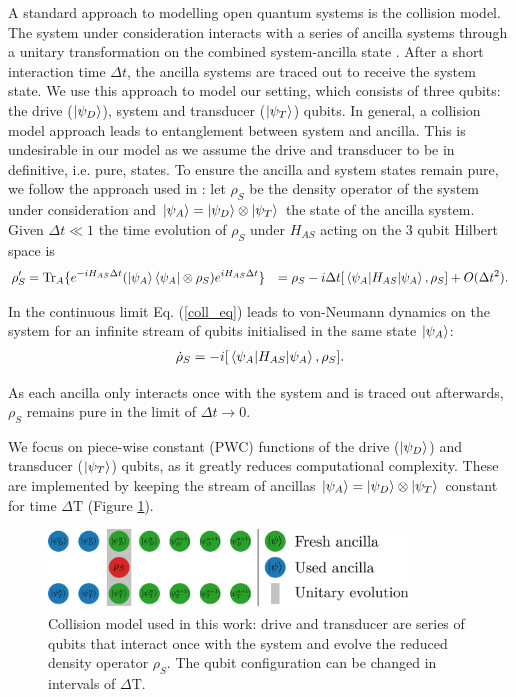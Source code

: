 A standard approach to modelling open quantum systems is the collision model.
The system under consideration interacts with a series of ancilla systems through a unitary transformation on the combined system-ancilla state \cite{Lorenzo_2017}. After a short interaction time $\Delta t$, the ancilla systems are traced out to receive the system state.
We use this approach to model our setting, which consists of three qubits: the drive ($\ket{\psi_D}$), system and transducer ($\ket{\psi_T}$) qubits.
In general, a collision model approach leads to entanglement between system and ancilla.
This is undesirable in our model as we assume the drive and transducer to be in definitive, i.e. pure, states.
To ensure the ancilla and system states remain pure, we follow the approach used in \cite{beyer2020}:
let $\rho_S$ be the density operator of the system under consideration and $\ket{\psi_A} = \ket{\psi_D} \otimes \ket{\psi_T}$ the state of the ancilla system.
Given $\Delta t \ll 1$ the time evolution of $\rho_S$ under $H_{AS}$ acting on the 3 qubit Hilbert space is
\begin{align}\label{coll_eq}
\rho'_S & = \mathrm{Tr}_A \{ e^{-i H_{AS} \Delta t} (\ket{\psi_A} \bra{\psi_A} \otimes \rho_S) e^{i H_{AS} \Delta t} \} & = \rho_S - i \Delta t [\expval{H_{AS}}{\psi_A}, \rho_S] + O(\Delta t^2).
\end{align}

In the continuous limit Eq. (\ref{coll_eq}) leads to von-Neumann dynamics on the system for an infinite stream of qubits initialised in the same state $\ket{\psi_A}$:
\begin{align*}
	\dot{\rho}_S = - i [\expval{H_{AS}}{\psi_A}, \rho_S].
\end{align*}

As each ancilla only interacts once with the system and is traced out afterwards, $\rho_S$ remains pure in the limit of $\Delta t \to 0$.


We focus on piece-wise constant (PWC) functions of the drive ($\ket{\psi_D}$) and transducer ($\ket{\psi_T}$) qubits, as it greatly reduces computational complexity.
These are implemented by keeping the stream of ancillas $\ket{\psi_A} = \ket{\psi_D} \otimes \ket{\psi_T}$ constant for time $\Delta \mathrm{T}$ (Figure \ref{collmodel}).

\begin{figure}[h]
	\centering
	\includegraphics[width=0.85\textwidth]{img/coll2}
	\caption{Collision model used in this work: drive and transducer are series of qubits that interact once with the system and evolve the reduced density operator $\rho_S$. The qubit configuration can be changed in intervals of $\Delta \mathrm{T}$.}
	\label{collmodel}
\end{figure}

